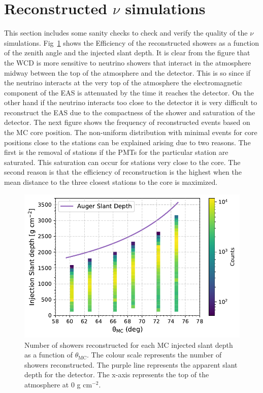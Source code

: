 \section{Reconstructed \texorpdfstring{$\nu$}{} simulations}
\label{sec:reco_possel}
This section includes some sanity checks to check and verify the quality of the $\nu$ simulations. Fig~\ref{fig:Slant_depth_rec} shows the Efficiency of the reconstructed showers as a function of the zenith angle and the injected slant depth. It is clear from the figure that the WCD is more sensitive to neutrino showers that interact in the atmosphere midway between the top of the atmosphere and the detector. This is so since if the neutrino interacts at the very top of the atmosphere the electromagnetic component of the EAS is attenuated by the time it reaches the detector. On the other hand if the neutrino interacts too close to the detector it is very difficult to reconstruct the EAS due to the compactness of the shower and saturation of the detector. The next figure shows the frequency of reconstructed events based on the MC core position. The non-uniform distribution with minimal events for core positions close to the stations can be explained arising due to two reasons. The first is the removal of stations if the PMTs for the particular station are saturated. This saturation can occur for stations very close to the core. The second reason is that the efficiency of reconstruction is the highest when the mean distance to the three closest stations to the core is maximized.

\begin{figure}[t!]
  \centering
  \includegraphics[width=14.5cm]{thesis_figures/Nu_analysis/MC_control/Slant_Depth_Profile_MC.pdf}
  \caption{Number of showers reconstructed for each MC injected slant depth as a function of $\theta_{\text{MC}}$. The colour scale represents the number of showers reconstructed. The purple line represents the apparent slant depth for the detector. The x-axis represents the top of the atmosphere at 0 g cm$^{-2}$.}
  \label{fig:Slant_depth_rec}
\end{figure}


